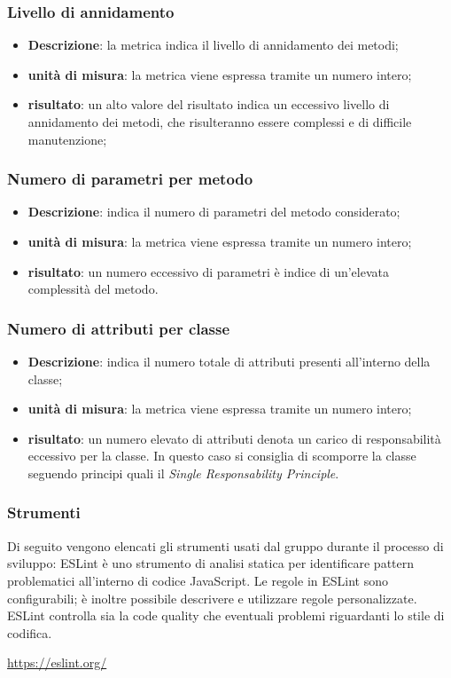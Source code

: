 	\subsubsection*{Livello di annidamento}
	\begin{itemize}
		\item{\textbf{Descrizione}}: la metrica indica il livello di annidamento dei metodi; 
		\item{\textbf{unità di misura}}: la metrica viene espressa tramite un numero intero; 
		\item{\textbf{risultato}}: un alto valore del risultato indica un eccessivo livello di annidamento dei metodi, che risulteranno essere complessi e di difficile manutenzione; 
	\end{itemize}

	\subsubsection*{Numero di parametri per metodo}
	\begin{itemize}
		\item{\textbf{Descrizione}}: indica il numero di parametri del metodo considerato; 
		\item{\textbf{unità di misura}}: la metrica viene espressa tramite un numero intero;  
		\item{\textbf{risultato}}: un numero eccessivo di parametri è indice di un'elevata complessità del metodo.
	\end{itemize}

	\subsubsection*{Numero di attributi per classe}
	\begin{itemize}
		\item{\textbf{Descrizione}}: indica il numero totale di attributi presenti all'interno della classe; 
		\item{\textbf{unità di misura}}: la metrica viene espressa tramite un numero intero; 
		\item{\textbf{risultato}}: un numero elevato di attributi denota un carico di responsabilità eccessivo per la classe. In questo caso si consiglia di scomporre la classe seguendo principi quali il \textit{Single Responsability Principle}. 
	\end{itemize}            

\subsubsection{Strumenti}
Di seguito vengono elencati gli strumenti usati dal gruppo durante il processo di sviluppo:
	ESLint è uno strumento di analisi statica per identificare pattern problematici all'interno di codice JavaScript. Le regole in ESLint sono configurabili; è inoltre possibile descrivere e utilizzare regole personalizzate. ESLint controlla sia la code quality che eventuali problemi riguardanti lo stile di codifica.
	\begin{center}
		\url{https://eslint.org/}
	\end{center}
	
